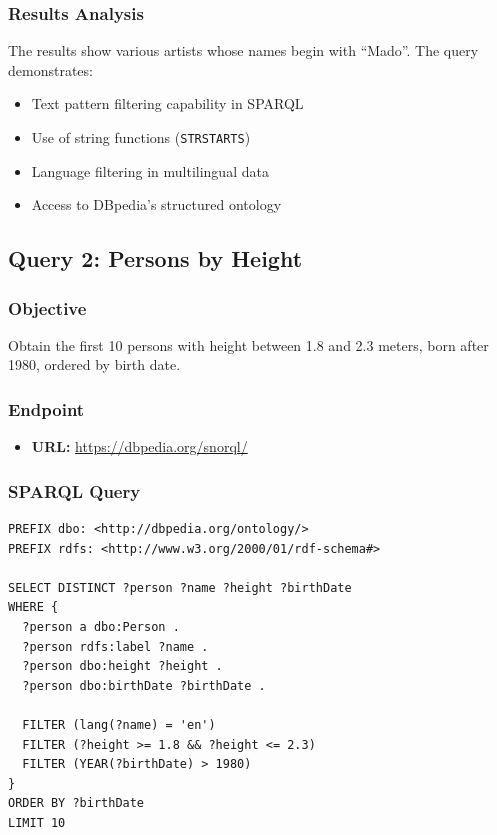 \documentclass[12pt,a4paper]{article}
\begin{document}
\subsubsection{Results Analysis}

The results show various artists whose names begin with ``Mado''. The query demonstrates:
\begin{itemize}
    \item Text pattern filtering capability in SPARQL
    \item Use of string functions (\texttt{STRSTARTS})
    \item Language filtering in multilingual data
    \item Access to DBpedia's structured ontology
\end{itemize}

\subsection{Query 2: Persons by Height}

\subsubsection{Objective}

Obtain the first 10 persons with height between 1.8 and 2.3 meters, born after 1980, ordered by birth date.

\subsubsection{Endpoint}

\begin{itemize}
    \item \textbf{URL:} \url{https://dbpedia.org/snorql/}
\end{itemize}

\subsubsection{SPARQL Query}

\begin{lstlisting}[language=SPARQL, caption={Query 2: Persons by height and birth date}]
PREFIX dbo: <http://dbpedia.org/ontology/>
PREFIX rdfs: <http://www.w3.org/2000/01/rdf-schema#>

SELECT DISTINCT ?person ?name ?height ?birthDate
WHERE {
  ?person a dbo:Person .
  ?person rdfs:label ?name .
  ?person dbo:height ?height .
  ?person dbo:birthDate ?birthDate .
  
  FILTER (lang(?name) = 'en')
  FILTER (?height >= 1.8 && ?height <= 2.3)
  FILTER (YEAR(?birthDate) > 1980)
}
ORDER BY ?birthDate
LIMIT 10
\end{lstlisting}
\end{document}
